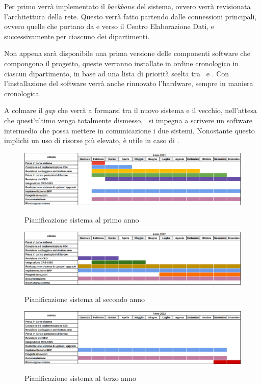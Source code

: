 		Per primo verrà implementato il \textit{backbone} del sistema, ovvero verrà revisionata l'architettura della rete.
		Questo verrà fatto partendo dalle connessioni principali, ovvero quelle che portano da e verso il Centro Elaborazione Dati, e successivamente per ciascuno dei dipartimenti.
		
		Non appena sarà disponibile una prima versione delle componenti software che compongono il progetto, queste verranno installate in ordine cronologico in ciascun dipartimento, in base ad una lista di priorità scelta tra \azienda~e \istituto.
		Con l'installazione del software verrà anche rinnovato l'hardware, sempre in maniera cronologica.
		
		A colmare il \textit{gap} che verrà a formarsi tra il nuovo sistema e il vecchio, nell'attesa che quest'ultimo venga totalmente dismesso, \azienda~si impegna a scrivere un software intermedio che possa mettere in comunicazione i due sistemi.
		Nonostante questo implichi un uso di risorse più elevato, è utile in caso di \rollback.
	
	\begin{figure}
		\centering
		\includegraphics[width=\linewidth-2cm]{img/pianificazione_anno_1.png}
		\caption{Pianificazione sistema al primo anno}
		\label{fig:anno_1}
		\includegraphics[width=\linewidth-2cm]{img/pianificazione_anno_2.png}
		\label{fig:anno_2}
		\caption{Pianificazione sistema al secondo anno}
		\includegraphics[width=\linewidth-2cm]{img/pianificazione_anno_3.png}
		\label{fig:anno_3}
		\caption{Pianificazione sistema al terzo anno}
	\end{figure}
	
